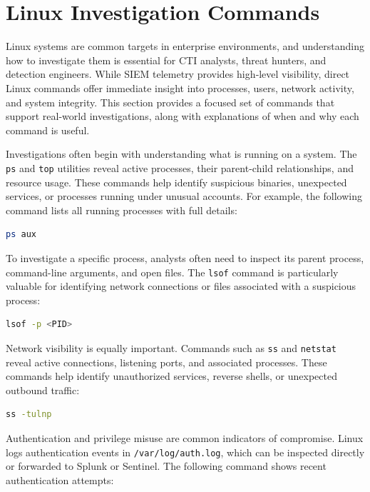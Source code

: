 \section{Linux Investigation Commands}

Linux systems are common targets in enterprise environments, and understanding how to investigate them is essential for CTI analysts, threat hunters, and detection engineers. While SIEM telemetry provides high‑level visibility, direct Linux commands offer immediate insight into processes, users, network activity, and system integrity. This section provides a focused set of commands that support real-world investigations, along with explanations of when and why each command is useful.

Investigations often begin with understanding what is running on a system. The \texttt{ps} and \texttt{top} utilities reveal active processes, their parent-child relationships, and resource usage. These commands help identify suspicious binaries, unexpected services, or processes running under unusual accounts. For example, the following command lists all running processes with full details:

\begin{lstlisting}[language=bash]
ps aux
\end{lstlisting}

To investigate a specific process, analysts often need to inspect its parent process, command-line arguments, and open files. The \texttt{lsof} command is particularly valuable for identifying network connections or files associated with a suspicious process:

\begin{lstlisting}[language=bash]
lsof -p <PID>
\end{lstlisting}

Network visibility is equally important. Commands such as \texttt{ss} and \texttt{netstat} reveal active connections, listening ports, and associated processes. These commands help identify unauthorized services, reverse shells, or unexpected outbound traffic:

\begin{lstlisting}[language=bash]
ss -tulnp
\end{lstlisting}

Authentication and privilege misuse are common indicators of compromise. Linux logs authentication events in \texttt{/var/log/auth.log}, which can be inspected directly or forwarded to Splunk or Sentinel. The following command shows recent authentication attempts:

